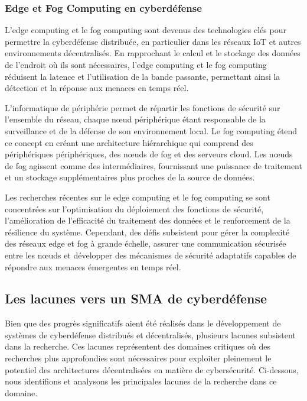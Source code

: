 \subsubsection{Edge et Fog Computing en cyberdéfense}

L'edge computing et le fog computing sont devenus des technologies clés pour permettre la cyberdéfense distribuée, en particulier dans les réseaux IoT et autres environnements décentralisés. En rapprochant le calcul et le stockage des données de l'endroit où ils sont nécessaires, l'edge computing et le fog computing réduisent la latence et l'utilisation de la bande passante, permettant ainsi la détection et la réponse aux menaces en temps réel.

L'informatique de périphérie permet de répartir les fonctions de sécurité sur l'ensemble du réseau, chaque nœud périphérique étant responsable de la surveillance et de la défense de son environnement local. Le fog computing étend ce concept en créant une architecture hiérarchique qui comprend des périphériques périphériques, des nœuds de fog et des serveurs cloud. Les nœuds de fog agissent comme des intermédiaires, fournissant une puissance de traitement et un stockage supplémentaires plus proches de la source de données.

Les recherches récentes sur le edge computing et le fog computing se sont concentrées sur l'optimisation du déploiement des fonctions de sécurité, l'amélioration de l'efficacité du traitement des données et le renforcement de la résilience du système. Cependant, des défis subsistent pour gérer la complexité des réseaux edge et fog à grande échelle, assurer une communication sécurisée entre les nœuds et développer des mécanismes de sécurité adaptatifs capables de répondre aux menaces émergentes en temps réel.

\subsection{Les lacunes vers un SMA de cyberdéfense}

Bien que des progrès significatifs aient été réalisés dans le développement de systèmes de cyberdéfense distribués et décentralisés, plusieurs lacunes subsistent dans la recherche. Ces lacunes représentent des domaines critiques où des recherches plus approfondies sont nécessaires pour exploiter pleinement le potentiel des architectures décentralisées en matière de cybersécurité. Ci-dessous, nous identifions et analysons les principales lacunes de la recherche dans ce domaine.

